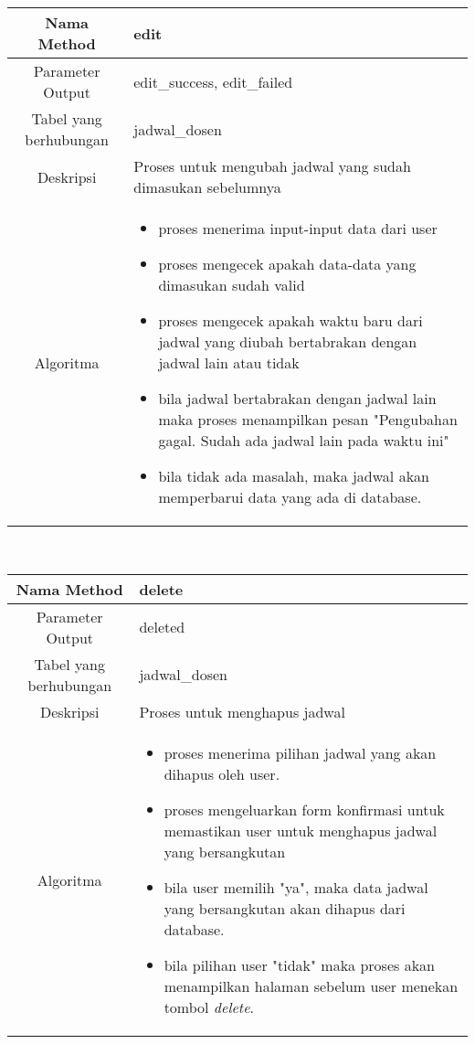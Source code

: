 \begin{tabular}{|c|p{11cm}|}
\hline
Nama Method 	& 	edit 	\\
\hline
Parameter Output & edit\_success, edit\_failed \\
\hline
Tabel yang berhubungan & jadwal\_dosen \\
\hline
Deskripsi	& Proses untuk mengubah jadwal yang sudah dimasukan sebelumnya \\
\hline
Algoritma	& \begin{itemize}
				\item proses menerima input-input data dari user
				\item proses mengecek apakah data-data yang dimasukan sudah valid
				\item proses mengecek apakah waktu baru dari jadwal yang diubah bertabrakan dengan jadwal lain atau tidak
				\item bila jadwal bertabrakan dengan jadwal lain maka proses menampilkan pesan "Pengubahan gagal. Sudah ada jadwal lain pada waktu ini"
				\item bila tidak ada masalah, maka jadwal akan memperbarui data yang ada di database.
				\end{itemize} \\
\hline
\end{tabular}
\\

\begin{tabular}{|c|p{11cm}|}
\hline
Nama Method 	& 	delete 	\\
\hline
Parameter Output & deleted \\
\hline
Tabel yang berhubungan & jadwal\_dosen \\
\hline
Deskripsi	& Proses untuk menghapus jadwal \\
\hline
Algoritma	& \begin{itemize}
				\item proses menerima pilihan jadwal yang akan dihapus oleh user.
				\item proses mengeluarkan form konfirmasi untuk memastikan user untuk menghapus jadwal yang bersangkutan
				\item bila user memilih "ya", maka data jadwal yang bersangkutan akan dihapus dari database.
				\item bila pilihan user "tidak" maka proses akan menampilkan halaman sebelum user menekan tombol \textit{delete}.
				\end{itemize} \\
\hline
\end{tabular}


